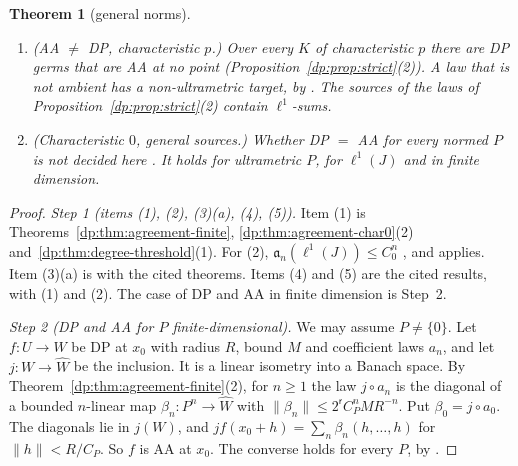 \documentclass[11pt]{amsart}
\newtheorem{theorem}{Theorem}[section]
\theoremstyle{definition}
\theoremstyle{remark}
\numberwithin{equation}{section}
\newcommand{\norm}[1]{\lVert #1\rVert}
\theoremstyle{plain}
\theoremstyle{definition}
\theoremstyle{plain}
\begin{document}
\begin{theorem}[general norms]
\begin{enumerate}
\begin{enumerate}
\end{enumerate}
\item \textup{(AA $\ne$ DP, characteristic $p$.)} Over every $K$ of characteristic $p$ there are DP germs that are AA at no point (Proposition~\ref{dp:prop:strict}(2)). A law that is not ambient has a non-ultrametric target, by \cite[Theorem~14.39(4)]{I}. The sources of the laws of Proposition~\ref{dp:prop:strict}(2) contain $\ell^1$-sums.
\item \textup{(Characteristic $0$, general sources.)} Whether DP $=$ AA for every normed $P$ is not decided here \cite[Question~14.42(1)]{I}. It holds for ultrametric $P$, for $\ell^1(J)$ and in finite dimension.
\end{enumerate}
\end{theorem}

\begin{proof}
\emph{Step 1 (items (1), (2), (3)(a), (4), (5)).} Item (1) is Theorems~\ref{dp:thm:agreement-finite}, \ref{dp:thm:agreement-char0}(2) and~\ref{dp:thm:degree-threshold}(1). For (2), $\mathfrak a_n(\ell^1(J))\le C_0^n$ \cite[Theorem~14.39(2)]{I}, and \cite[Theorem~14.38(1)]{I} applies. Item (3)(a) is \cite[Theorem~14.39(1)]{I} with the cited theorems. Items (4) and (5) are the cited results, with (1) and (2). The case of DP and AA in finite dimension is Step~2.

\emph{Step 2 (DP and AA for $P$ finite-dimensional).} We may assume $P\ne\{0\}$. Let $f\colon U\to W$ be DP at $x_0$ with radius $R$, bound $M$ and coefficient laws $a_n$, and let $j\colon W\to\widehat W$ be the inclusion. It is a linear isometry into a Banach space. By Theorem~\ref{dp:thm:agreement-finite}(2), for $n\ge1$ the law $j\circ a_n$ is the diagonal of a bounded $n$\nobreakdash-linear map $\beta_n\colon P^n\to\widehat W$ with $\norm{\beta_n}\le2^{\mathsf r}C_P^nMR^{-n}$. Put $\beta_0=j\circ a_0$. The diagonals lie in $j(W)$, and $jf(x_0+h)=\sum_n\beta_n(h,\dots,h)$ for $\norm h<R/C_P$. So $f$ is AA at $x_0$. The converse holds for every $P$, by \cite[Proposition~14.9(1)]{I}.


\end{proof}
\end{document}
